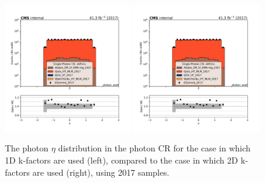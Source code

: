 \begin{figure}
    \begin{center}
        \includegraphics[width=0.49\textwidth]{fig/datamc/cr_g_vbf/cr_g_vbf_photon_eta0_losf_2017.pdf}
        \includegraphics[width=0.49\textwidth]{fig/datamc_2dkfac/cr_g_vbf/cr_g_vbf_photon_eta0_losf_2017.pdf} 
        \caption{The photon $\eta$ distribution in the photon CR for the case in which 1D k-factors are used (left), 
        compared to the case in which 2D k-factors are used (right), using 2017 samples.}
        \label{fig:photon_eta_2017}
    \end{center}
\end{figure}

